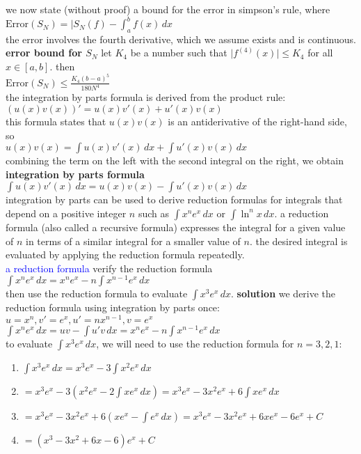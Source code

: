 \documentclass{article}
\begin{document}
we now state (without proof) a bound for the error in simpson's rule, where\\
$\text{Error}(S_N) = \lvert S_N(f) - \int_{a}^{b}f(x)\,dx$\\
the error involves the fourth derivative, which we assume exists and is continuous.\\

\textbf{error bound for $S_N$} let $K_4$ be a number such that $\lvert f^{(4)}(x)\rvert \leq K_4$ for all $x \in [a, b]$. then\\
$\text{Error}(S_N) \leq \frac{K_4(b - a)^5}{180N^4}$\\

the integration by parts formula is derived from the product rule:\\
$(u(x)v(x))' = u(x)v'(x) + u'(x)v(x)$\\
this formula states that $u(x)v(x)$ is an antiderivative of the right-hand side, so\\
$u(x)v(x) = \int u(x)v'(x)\,dx + \int u'(x)v(x)\,dx$\\
combining the term on the left with the second integral on the right, we obtain\\

\textbf{integration by parts formula}\\
$\int u(x)v'(x)\,dx = u(x)v(x) - \int u'(x)v(x)\,dx$\\

integration by parts can be used to derive reduction formulas for integrals that depend on a positive integer $n$ such as $\int x^ne^x\,dx$ or $\int \ln^n x\,dx$. a reduction formula (also called a recursive formula) expresses the integral for a given value of $n$ in terms of a similar integral for a smaller value of $n$. the desired integral is evaluated by applying the reduction formula repeatedly.\\

\textcolor{blue}{a reduction formula} verify the reduction formula\\
$\int x^ne^x\,dx = x^ne^x - n \int x^{n-1}e^x\,dx$\\
then use the reduction formula to evaluate $\int x^3e^x\,dx$.
\textbf{solution} we derive the reduction formula using integration by parts once:\\
$u = x^n, v'=e^x, u' = nx^{n-1}, v = e^x$\\
$\int x^ne^x\,dx = uv - \int u'v\,dx = x^ne^x - n\int x^{n-1}e^x\,dx$\\
to evaluate $\int x^3e^x\,dx$, we will need to use the reduction formula for $n = 3, 2, 1$:\\
	\begin{enumerate}
		\item $\int x^3e^x\,dx = x^3e^x - 3\int x^2e^x\,dx$
		\item $= x^3e^x - 3(x^2e^x - 2\int xe^x\,dx) = x^3e^x - 3x^2e^x + 6 \int xe^x\,dx$
		\item $= x^3e^x - 3x^2e^x + 6(xe^x - \int e^x\,dx) = x^3e^x - 3x^2e^x + 6xe^x - 6e^x + C$
		\item $= (x^3 - 3x^2 + 6x - 6)e^x + C$
	\end{enumerate}
\end{document}
